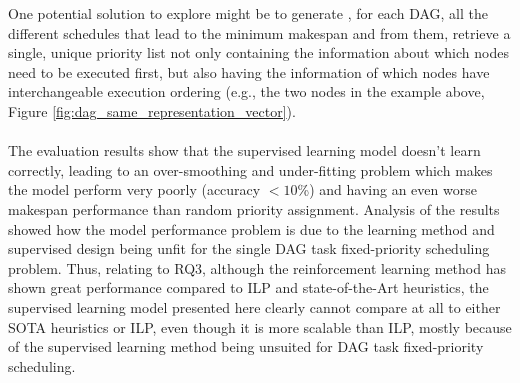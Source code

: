 One potential solution to explore might be to generate
, for each DAG, all the different schedules that lead to the minimum
makespan and from them, retrieve a single, unique priority list
not only containing the information about which nodes need to be
executed first, but also having the information of which nodes
have interchangeable execution ordering 
(e.g., the two nodes in the example above, Figure \ref{fig:dag_same_representation_vector}).
\\\\

The evaluation results show that the supervised learning model
doesn't learn correctly, leading to an over-smoothing and under-fitting problem
which makes the model perform very poorly (accuracy $<10$\%)
and having an even worse makespan performance than random priority assignment.
Analysis of the results showed how the model performance problem
is due to the learning method and supervised design being unfit for
the single DAG task fixed-priority scheduling problem.
Thus, relating to RQ3, although the reinforcement learning
method has shown great performance compared to ILP\cite{Zhao2024GATDRLmodel}
and state-of-the-Art heuristics\cite{Lee2021GlobalDagSchedDRL},
the supervised learning model presented here 
clearly cannot compare at all to either SOTA heuristics
or ILP, even though it is more scalable than ILP, 
mostly because of the supervised learning method being unsuited 
for DAG task fixed-priority scheduling.